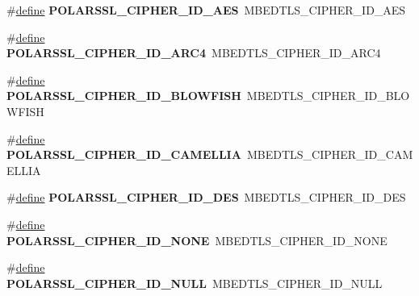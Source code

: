 \begin{DoxyCompactItemize}
\item 
\mbox{\label{compat-1_83_8h_adab88e39846506f6247c2364210072d4}} 
\#\hyperlink{structdefine}{define} {\bfseries P\+O\+L\+A\+R\+S\+S\+L\+\_\+\+C\+I\+P\+H\+E\+R\+\_\+\+I\+D\+\_\+\+A\+ES}~M\+B\+E\+D\+T\+L\+S\+\_\+\+C\+I\+P\+H\+E\+R\+\_\+\+I\+D\+\_\+\+A\+ES
\item 
\mbox{\label{compat-1_83_8h_a7b0e1787741b4ef7547026c45a011726}} 
\#\hyperlink{structdefine}{define} {\bfseries P\+O\+L\+A\+R\+S\+S\+L\+\_\+\+C\+I\+P\+H\+E\+R\+\_\+\+I\+D\+\_\+\+A\+R\+C4}~M\+B\+E\+D\+T\+L\+S\+\_\+\+C\+I\+P\+H\+E\+R\+\_\+\+I\+D\+\_\+\+A\+R\+C4
\item 
\mbox{\label{compat-1_83_8h_aad6c4e11a37cef65e21e01202078223c}} 
\#\hyperlink{structdefine}{define} {\bfseries P\+O\+L\+A\+R\+S\+S\+L\+\_\+\+C\+I\+P\+H\+E\+R\+\_\+\+I\+D\+\_\+\+B\+L\+O\+W\+F\+I\+SH}~M\+B\+E\+D\+T\+L\+S\+\_\+\+C\+I\+P\+H\+E\+R\+\_\+\+I\+D\+\_\+\+B\+L\+O\+W\+F\+I\+SH
\item 
\mbox{\label{compat-1_83_8h_a9b076c3dcc9545751c82943374cd4380}} 
\#\hyperlink{structdefine}{define} {\bfseries P\+O\+L\+A\+R\+S\+S\+L\+\_\+\+C\+I\+P\+H\+E\+R\+\_\+\+I\+D\+\_\+\+C\+A\+M\+E\+L\+L\+IA}~M\+B\+E\+D\+T\+L\+S\+\_\+\+C\+I\+P\+H\+E\+R\+\_\+\+I\+D\+\_\+\+C\+A\+M\+E\+L\+L\+IA
\item 
\mbox{\label{compat-1_83_8h_a7cda621d0e88257c164b4672fcfd0acd}} 
\#\hyperlink{structdefine}{define} {\bfseries P\+O\+L\+A\+R\+S\+S\+L\+\_\+\+C\+I\+P\+H\+E\+R\+\_\+\+I\+D\+\_\+\+D\+ES}~M\+B\+E\+D\+T\+L\+S\+\_\+\+C\+I\+P\+H\+E\+R\+\_\+\+I\+D\+\_\+\+D\+ES
\item 
\mbox{\label{compat-1_83_8h_a3bc293c59d79997b1775fe47fa40c1c0}} 
\#\hyperlink{structdefine}{define} {\bfseries P\+O\+L\+A\+R\+S\+S\+L\+\_\+\+C\+I\+P\+H\+E\+R\+\_\+\+I\+D\+\_\+\+N\+O\+NE}~M\+B\+E\+D\+T\+L\+S\+\_\+\+C\+I\+P\+H\+E\+R\+\_\+\+I\+D\+\_\+\+N\+O\+NE
\item 
\mbox{\label{compat-1_83_8h_a16de9ada8f2705d775b7e9e0c971b8d7}} 
\#\hyperlink{structdefine}{define} {\bfseries P\+O\+L\+A\+R\+S\+S\+L\+\_\+\+C\+I\+P\+H\+E\+R\+\_\+\+I\+D\+\_\+\+N\+U\+LL}~M\+B\+E\+D\+T\+L\+S\+\_\+\+C\+I\+P\+H\+E\+R\+\_\+\+I\+D\+\_\+\+N\+U\+LL

\end{DoxyCompactItemize}
